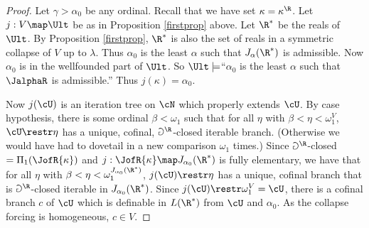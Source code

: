 \begin{proof}
Let $\gamma>\alpha_0$ be any ordinal. Recall that we
have set $\kappa=\kappa^{\R}$.
Let $j:V\map \Ult$ be as in Proposition \ref{firstprop} above.
 Let $\R^*$ be the reals of $\Ult$.
By  Proposition \ref{firstprop}, $\R^*$ is also the set of reals in a
symmetric
collapse of $V$ up to $\lambda$. Thus $\alpha_0$ is the least
$\alpha$ such that $J_{\alpha}(\R^*)$ is admissible.
 Now $\alpha_0$ is in the wellfounded part of $\Ult$.
So $\Ult\models$``$\alpha_0$ is the least
$\alpha$ such that $\JalphaR$ is admissible.'' Thus $j(\kappa)=\alpha_0$.

Now $j(\cU)$ is an iteration tree on $\cN$ which properly extends
$\cU$. By case hypothesis, there is some ordinal $\beta<\omega_1$
such that for all $\eta$ with $\beta<\eta<\omega_1^V$,
$\cU\restr\eta$ has a unique, cofinal, $\Game^{\R}$-closed iterable
branch.
 (Otherwise we would have had to dovetail in a new comparison
$\omega_1$ times.)
Since $\Game^{\R}$-closed $= \Pi_1(\JofR{\kappa})$ and
$j:\JofR{\kappa}\map J_{\alpha_0}(\R^*)$ is fully elementary, we have
that for all $\eta$ with $\beta<\eta<\omega_1^{J_{\alpha_0}(\R^*)}$,
$j(\cU)\restr\eta$ has a unique, cofinal branch that is
$\Game^{\R}$-closed iterable in $J_{\alpha_0}(\R^*)$.
 Since $j(\cU)\restr\omega_1^{V}=\cU$,
 there is
a cofinal branch $c$ of $\cU$ which is definable in $L(\R^*)$ from
$\cU$ and $\alpha_0$. As the collapse forcing is homogeneous, $c\in V$.
\end{proof}

